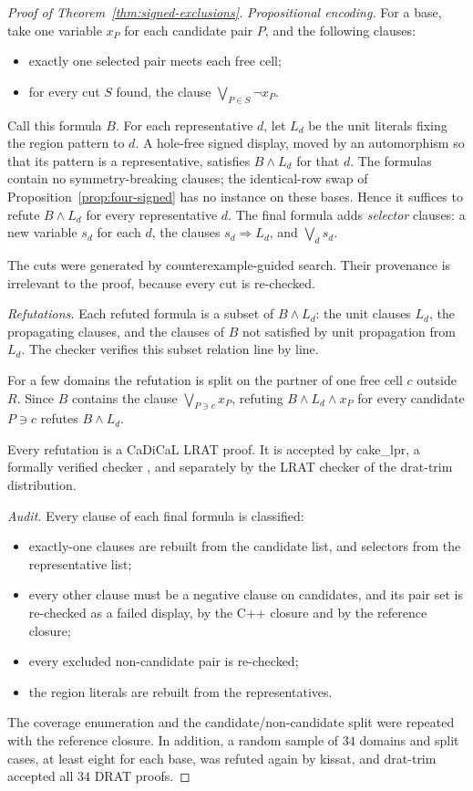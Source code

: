 \begin{proof}[Proof of Theorem~\ref{thm:signed-exclusions}]
\emph{Propositional encoding.} For a base, take one variable $x_P$ for
each candidate pair $P$, and the following clauses:
\begin{itemize}
\item exactly one selected pair meets each free cell;
\item for every cut $S$ found, the clause $\bigvee_{P\in S}\neg x_P$.
\end{itemize}
Call this formula $B$. For each representative $d$, let $L_d$ be the unit
literals fixing the region pattern to $d$. A hole-free signed display,
moved by an automorphism so that its pattern is a representative,
satisfies $B\wedge L_d$ for that $d$. The formulas contain no
symmetry-breaking clauses; the identical-row swap of
Proposition~\ref{prop:four-signed} has no instance on these bases.
Hence it suffices to refute $B\wedge L_d$ for every representative $d$.
The final formula adds \emph{selector} clauses: a new variable $s_d$
for each $d$, the clauses $s_d\Rightarrow L_d$, and $\bigvee_d s_d$.

The cuts were generated by counterexample-guided search. Their
provenance is irrelevant to the proof, because every cut is re-checked.

\emph{Refutations.} Each refuted formula is a subset of $B\wedge L_d$: the unit clauses
$L_d$, the propagating clauses, and the clauses of $B$ not satisfied
by unit propagation from $L_d$. The checker verifies this subset relation line by
line.

For a few domains the refutation is split on the partner of one free cell
$c$ outside $R$. Since $B$ contains the clause $\bigvee_{P\ni c}x_P$,
refuting $B\wedge L_d\wedge x_P$ for every candidate $P\ni c$ refutes
$B\wedge L_d$.

Every refutation is a CaDiCaL LRAT proof. It is accepted by cake\_lpr, a
formally verified checker \cite{CakeLPR}, and separately by the LRAT checker of the
drat-trim distribution.

\emph{Audit.} Every clause of each final formula is classified:
\begin{itemize}
\item exactly-one clauses are rebuilt from the candidate list, and
      selectors from the representative list;
\item every other clause must be a negative clause on candidates, and its
      pair set is re-checked as a failed display, by the C++ closure and by
      the reference closure;
\item every excluded non-candidate pair is re-checked;
\item the region literals are rebuilt from the representatives.
\end{itemize}
The coverage enumeration and the candidate/non-candidate split were
repeated with the reference closure.
In addition, a random sample of $34$ domains and split cases, at least
eight for each base, was refuted again by kissat, and drat-trim accepted
all $34$ DRAT proofs.


\end{proof}
